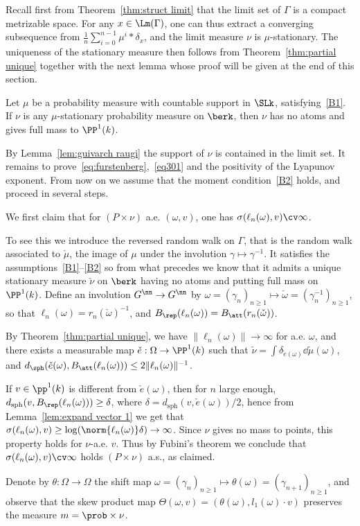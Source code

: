 Recall first from Theorem~\ref{thm:struct limit} that the limit set of $\Gamma$ is a compact metrizable space. For any $x\in \Lm(\Gamma)$, one can thus extract a converging subsequence from $\frac1{n} \sum_{i=0}^{n-1}\mu^ i \ast \delta_{x}$, and the limit measure $\nu$ is $\mu$-stationary. The uniqueness of the stationary measure then follows from Theorem~\ref{thm:partial unique} together with the next lemma whose proof will be given at the end of this section.

\begin{lemm}\label{lem:Hk}
Let $\mu$ be a probability measure with countable support in $\SLk$, satisfying~\eqref{B1}. If $\nu$ is any $\mu$-stationary probability measure on $\berk$, then $\nu$ has no atoms and gives full mass to $ \PP^1(k)$.
\end{lemm}

By Lemma~\ref{lem:guivarch raugi} the support of $\nu$ is contained in the limit set. It remains to prove~\eqref{eq:furstenberg},~\eqref{eq301} and the positivity of the Lyapunov exponent. From now on we assume that the moment condition~\eqref{B2} holds, and proceed in several steps.

\begin{step}[Step 1]
We first claim that for $(P\times \nu)$ a.e. $(\omega,v)$, one has $\sigma(\ell_n(\omega), v)\cv\infty$.

To see this we introduce the reversed random walk on $\Gamma$, that is the random walk associated to $\check \mu$, the image of $\mu$ under the involution $\gamma\mapsto \gamma^{-1}$. It satisfies the assumptions~\eqref{B1}--\eqref{B2} so from what precedes we know that it admits a unique stationary measure $\check\nu$ on $\berk$ having no atoms and putting full mass on $\PP^1(k)$. Define an involution $G^\nn\to G^\nn$ by $\omega = (\gamma_n)_{n\geq 1 }\mapsto \check \omega = (\gamma_n^{-1})_{n\geq 1}$, so that $\ell_n(\omega) = r_n(\check \omega)^{-1}$, and $B_{\rep}(\ell_n(\omega)) = B_{\att}(r_n(\check \omega))$.

By Theorem~\ref{thm:partial unique}, we have $\| \ell_n(\omega)\| \to \infty$ for a.e. $\omega$, and there exists a measurable map $\check{e}: \Omega \to \PP^1(k)$ such that $\check \nu = \int \delta_{\check e(\omega)} \dd\check\mu(\omega)$, and $d_{\sph}(\check e(\omega), B_\att(\ell_n(\omega))) \le 2\| \ell_n(\omega)\|^{-1}$.

If $v\in \pp^1(k)$ is different from $\check e(\omega)$, then for $n$ large enough, $d_{\mathrm{sph}}(v, B_{\rep}(\ell_n(\omega)))\geq \delta$, where $\delta = d_{\mathrm{sph}}(v, \check e(\omega))/2$, hence from Lemma~\ref{lem:expand vector 1} we get that $\sigma(\ell_n(\omega), v)\geq \log (\norm {\ell_n(\omega)}\delta)\to \infty$. Since $\nu$ gives no mass to points, this property holds for $\nu$-a.e. $v$. Thus by Fubini's theorem we conclude that $\sigma(\ell_n(\omega), v)\cv\infty$ holds $(P\times \nu)$ a.s., as claimed.

Denote by $\theta : \Omega \to \Omega$ the shift map $\omega = (\gamma_n)_{n\ge 1} \mapsto \theta(\omega) = (\gamma_{n+1})_{n\ge 1}$, and observe that the skew product map $\Theta(\omega,v) = (\theta(\omega), l_1(\omega) \cdot v)$ preserves the measure $m = \prob\times \nu$.
\end{step}

